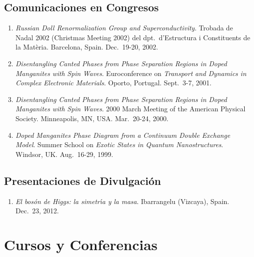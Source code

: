 \documentclass{article}
\begin{document}

\subsection*{Comunicaciones en Congresos}

\begin{enumerate}
\item
{\it Russian Doll Renormalization Group and Superconductivity}. 
Trobada de Nadal 2002 (Christmas Meeting 2002) del dpt.~d'Estructura 
i Constituents de la Mat\`eria. 
Barcelona, Spain.
Dec.~19-20, 2002.

\item
{\it Disentangling Canted Phases from Phase Separation Regions in Doped 
Manganites with Spin Waves}. 
Euroconference on {\it Transport and Dynamics in Complex Electronic Materials}.
Oporto, Portugal. 
Sept.~3-7, 2001. 

\item 
{\it Disentangling Canted Phases from Phase
Separation Regions in Doped Manganites with Spin Waves}.
2000 March Meeting of the American Physical Society. 
Minneapolis, MN, USA. 
Mar.~20-24, 2000.

\item 
{\it Doped Manganites Phase Diagram from a Continuum Double Exchange Model}. 
Summer School on {\it Exotic States in Quantum Nanostructures}. 
Windsor, UK. 
Aug.~16-29, 1999.
\end{enumerate}


\subsection*{Presentaciones de Divulgaci\'on}

\begin{enumerate}
\item
{\it El bos\'on de Higgs: la simetr\'{\i}a y la masa}. 
Ibarrangelu (Vizcaya), Spain.
Dec.~23, 2012. 
\end{enumerate}

\newpage


\section*{Cursos y Conferencias}
\end{document}
